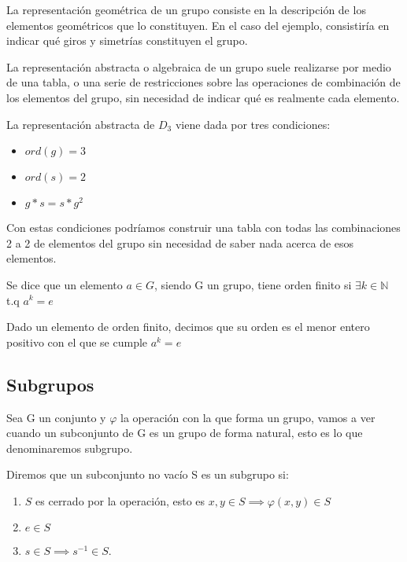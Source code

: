 \documentclass[a4paper,10pt]{apuntes}
\begin{document}
 La representación geométrica de un grupo consiste en la descripción de los elementos geométricos que lo constituyen. En el caso del ejemplo, consistiría en indicar qué giros y simetrías constituyen el grupo.
 
 La representación abstracta o algebraica de un grupo suele realizarse por medio de una tabla, o una serie de restricciones sobre las operaciones de combinación de los elementos del grupo, sin necesidad de indicar qué es realmente cada elemento.
 \begin{example}
  La representación abstracta de $D_{3}$  viene dada por tres condiciones:
 \begin{itemize}
  \item $ord(g)=3$
  \item $ord(s)=2$
  \item $g\ast s=s\ast g^{2}$
 \end{itemize}
 
Con estas condiciones podríamos construir una tabla con todas las combinaciones 2 a 2 de elementos del grupo sin necesidad
 de saber nada acerca de esos elementos.
 \end{example}
 
 \begin{defn}
  Se dice que un elemento $a\in G$, siendo G un grupo, tiene orden finito si $\exists k\in\mathds{N}$  t.q  $a^{k}=e$
 \end{defn}
 
 \begin{defn}[Orden]
  Dado un elemento de orden finito, decimos que su orden es el menor entero positivo con el que se cumple $a^{k}=e$
 \end{defn}
 
\subsection{Subgrupos}
 Sea G un conjunto y $\varphi$  la operación con la que forma un grupo, vamos a ver cuando un subconjunto de G es un grupo de forma natural,
 esto es lo que denominaremos subgrupo.
 
 \begin{defn}[Subgrupo]
  Diremos que un subconjunto no vacío S es un subgrupo si:
  \begin{enumerate}
   \item $S$ es cerrado por la operación, esto es $x,y \in S \implies \varphi(x,y) \in S$
   \item $e \in S$
   \item $s \in S \implies s^{-1}\in S$.
  \end{enumerate}
 \end{defn} 
 
\end{document}
